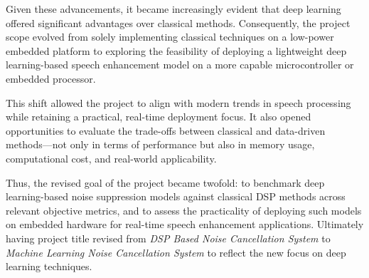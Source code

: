 Given these advancements, it became increasingly evident that deep learning offered significant advantages over classical methods. Consequently, the project scope evolved from solely implementing classical techniques on a low-power embedded platform to exploring the feasibility of deploying a lightweight deep learning-based speech enhancement model on a more capable microcontroller or embedded processor.

This shift allowed the project to align with modern trends in speech processing while retaining a practical, real-time deployment focus. It also opened opportunities to evaluate the trade-offs between classical and data-driven methods—not only in terms of performance but also in memory usage, computational cost, and real-world applicability.

Thus, the revised goal of the project became twofold: to benchmark deep learning-based noise suppression models against classical DSP methods across relevant objective metrics, and to assess the practicality of deploying such models on embedded hardware for real-time speech enhancement applications. Ultimately having project title revised from \textit{DSP Based Noise Cancellation System} to \textit{Machine Learning Noise Cancellation System} to reflect the new focus on deep learning techniques.
